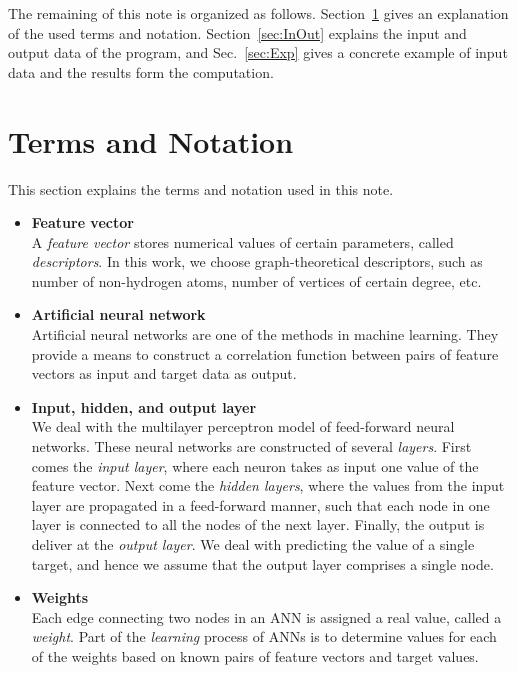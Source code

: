 \documentclass[11pt, titlepage, dvipdfmx, twoside]{article}
\begin{document}
The remaining of this note is organized as follows.
Section~\ref{sec:Pre} gives an explanation 
of the used terms and notation.
%
Section~\ref{sec:InOut} explains the 
input and output data of the program,
and Sec.~\ref{sec:Exp} gives a concrete
example of input data and the results form the computation.


\section{Terms and Notation}
\label{sec:Pre}
%
This section explains the terms and notation used in this note.


\begin{itemize}

\item {\bf Feature vector}\\
%
A {\em feature vector} stores numerical values of certain parameters,
called {\em descriptors}.
In this work, we choose graph-theoretical descriptors, such as number of 
non-hydrogen atoms, number of vertices of certain degree, etc.

\item {\bf Artificial neural network}\\
%
Artificial neural networks are one of the methods in machine learning.
They provide a means to construct a correlation function between 
pairs of feature vectors as input and target data as output.


\item {\bf Input, hidden, and output layer}\\
%
We deal with the multilayer perceptron model 
of feed-forward neural networks.
These neural networks are constructed of several {\em layers}.
First comes the \emph{input layer}, where each neuron takes as input
one value of the feature vector.
Next come the \emph{hidden layers}, where the 
values from the input layer are propagated in a feed-forward manner,
such that each node in one layer is connected to all the nodes of the next layer. 
Finally, the output is deliver at the \emph{output layer}.
We deal with predicting the value of a single target,
and hence we assume that the output layer comprises a single node.

\item {\bf Weights}\\
%
Each edge connecting two nodes in an ANN is assigned a real value,
called a \emph{weight}.
Part of the \emph{learning} process of ANNs is to determine values for each of the weights
based on known pairs of feature vectors and target values.


\end{itemize}
\end{document}
